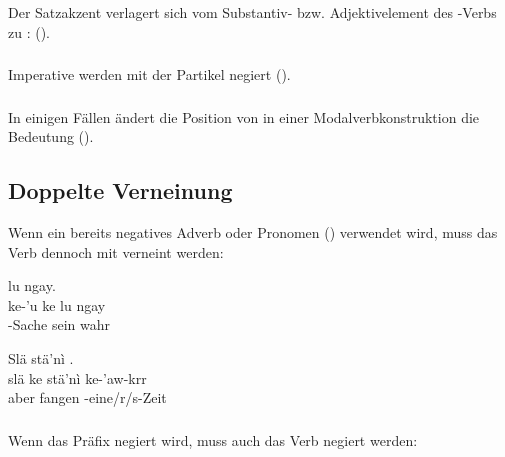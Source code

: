 \noindent Der Satzakzent verlagert sich vom Substantiv- bzw. Adjektivelement des -Verbs zu :  (). \label{syn:neg:si-const}

\subsubsection{} Imperative werden mit der Partikel  negiert (). 

\subsubsection{} In einigen Fällen ändert die Position von  in einer Modalverbkonstruktion die Bedeutung ().

\subsection{Doppelte Verneinung} Wenn ein bereits negatives Adverb oder Pronomen () verwendet wird, muss das Verb dennoch mit  verneint werden:\label{syn:neg:pleon}

\begin{interlin}
	\glll \Npawl{}  lu ngay. \\
	ke-'u ke lu ngay \\
	-Sache  sein wahr \\
\end{interlin}

\begin{interlin}
	\glll Slä  stä'nì . \\
	slä ke stä'nì ke-'aw-krr \\
	aber  fangen -eine/r/s-Zeit \\
\end{interlin}

\subsubsection{} Wenn das Präfix  negiert wird, muss auch das Verb negiert werden:

